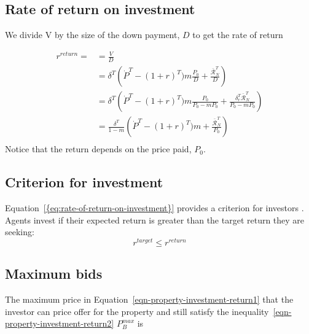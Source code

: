 {\color{black}

\subsection{Rate of return on investment}
We divide V by the size of the down payment, $D$ to get the  rate of return  

\begin{align}
r^{return} =
  &= \frac{V}{D}  \nonumber \\
  &= \delta^T \left(\dot P^T - (1+r)^T)m \frac{P_0}{D} + \frac{\mathcal{\bar{R}}^T_N}{D}\right)\\
  &= \delta^T \left(\dot P^T - (1+r)^T)m \frac{P_0}{P_0-mP_0} + \frac{\delta_r^T\mathcal{\bar{R}}^T_N}{P_0-mP_0}\right)\\  
  &= \frac{\delta^T}{1-m} \left(\dot P^T - (1+r)^T)m  + \frac{\mathcal{\bar{R}}^T_N}{P_0}\right)\\
\end{align}
Notice that the return depends on the price paid, $P_0$.

\subsection{Criterion for investment}
Equation~\ref{{eq:rate-of-return-on-investment}} provides a criterion for investors
.%
 Agents invest if  their expected return is greater than the target return they are seeking:
\begin{equation}
r^{target}\le r^{return} 
\label{eqn-property-investment-return2}
\end{equation}

% 

\subsection{Maximum bids}
The maximum price in Equation~\ref{eqn-property-investment-return1} that the investor can price offer for the property  and still satisfy the inequality~\ref{eqn-property-investment-return2} $P_B^{max}$ is

}
